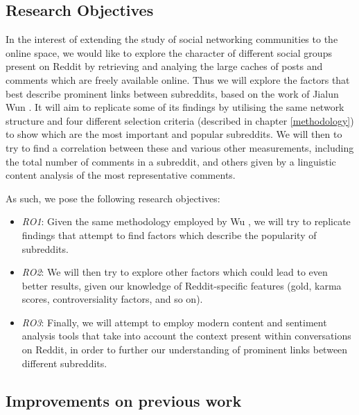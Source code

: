 \documentclass[bsc,frontabs,twoside,singlespacing,parskip,deptreport]{infthesis}
\begin{document}
\subsection{Research Objectives}
In the interest of extending the study of social networking communities to the online space, we would like to explore the character of different social groups present on Reddit by retrieving and analying the large caches of posts and comments which are freely available online. Thus we will explore the factors that best describe prominent links between subreddits, based on the work of Jialun Wun \cite{masters}. It will aim to replicate some of its findings by utilising the same network structure and four different selection criteria (described in chapter \ref{methodology}) to show which are the most important and popular subreddits. We will then to try to find a correlation between these and various other measurements, including the total number of comments in a subreddit, and others given by a linguistic content analysis of the most representative comments.

As such, we pose the following research objectives:

\begin{itemize}
	\item \textit{RO1}: Given the same methodology employed by Wu \cite{masters}, we will try to replicate findings that attempt to find factors which describe the popularity of subreddits.
	\item \textit{RO2}: We will then try to explore other factors which could lead to even better results, given our knowledge of Reddit-specific features (gold, karma scores, controversiality factors, and so on).
	\item \textit{RO3}: Finally, we will attempt to employ modern content and sentiment analysis tools that take into account the context present within conversations on Reddit, in order to further our understanding of prominent links between different subreddits.
\end{itemize}

\subsection{Improvements on previous work}
\end{document}
